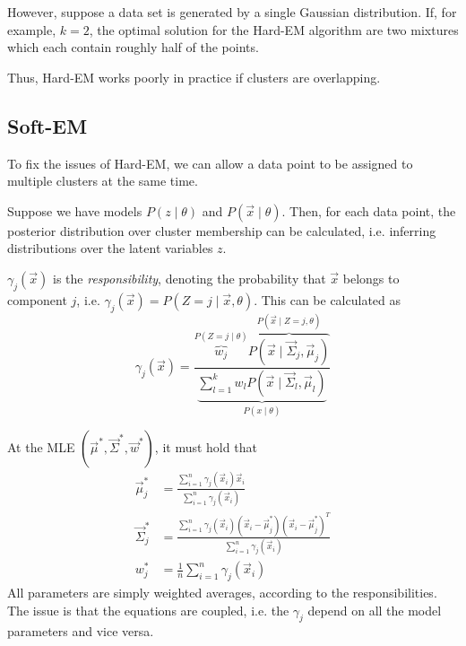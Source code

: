However, suppose a data set is generated by a single
Gaussian distribution.
If, for example, $k=2$, the optimal solution for
the Hard-EM algorithm are two mixtures which each
contain roughly half of the points.

Thus, Hard-EM works poorly in practice if clusters
are overlapping.


\subsection{Soft-EM}
To fix the issues of Hard-EM,
we can allow a data point to be assigned to multiple clusters
at the same time.

Suppose we have models $P(z \mid \theta)$ and 
$P(\vec{x} \mid \theta)$.
Then, for each data point, the posterior distribution over
cluster membership can be calculated,
i.e. inferring distributions over the latent variables $z$.

$\gamma_j(\vec{x})$ is the \emph{responsibility},
denoting the probability that $\vec{x}$ belongs to component $j$,
i.e. $\gamma_j(\vec{x}) = P(Z = j \mid \vec{x}, \theta)$.
This can be calculated as
\begin{equation*}
    \gamma_j(\vec{x}) = \frac{
        \overbrace{w_j}^{P(Z = j \mid \theta)}
        \overbrace{P(\vec{x} \mid \vec{\Sigma}_j, \vec{\mu}_j)}^{P(\vec{x} \mid Z = j, \theta)}
    }{
        \underbrace{
        \sum_{l=1}^k{
            w_l P(\vec{x} \mid \vec{\Sigma}_l, \vec{\mu}_l)
        }
        }_{P(x \mid \theta)}
    }
\end{equation*}

At the MLE $(\vec{\mu}^*, \vec{\Sigma}^*, \vec{w}^*)$,
it must hold that
\begin{align*}
    \vec{\mu}^*_j &= \frac{\sum_{i=1}^n{\gamma_j(\vec{x}_i) \vec{x}_i}}{\sum_{i=1}^n{\gamma_j(\vec{x}_i)}} \\
    \vec{\Sigma}^*_j &= \frac{
    \sum_{i=1}^n{
    \gamma_j(\vec{x}_i) (\vec{x}_i - \vec{\mu}_j^*) (\vec{x}_i - \vec{\mu}_j^*)^T
    }
    }{
        \sum_{i=1}^n{\gamma_j(\vec{x}_i)}
    }
    \\
    w_j^* &= \frac{1}{n} \sum_{i=1}^n{\gamma_j(\vec{x}_i)}
\end{align*}
All parameters are simply weighted averages,
according to the responsibilities.
The issue is that the equations are coupled,
i.e. the $\gamma_j$ depend on
all the model parameters and vice versa.


